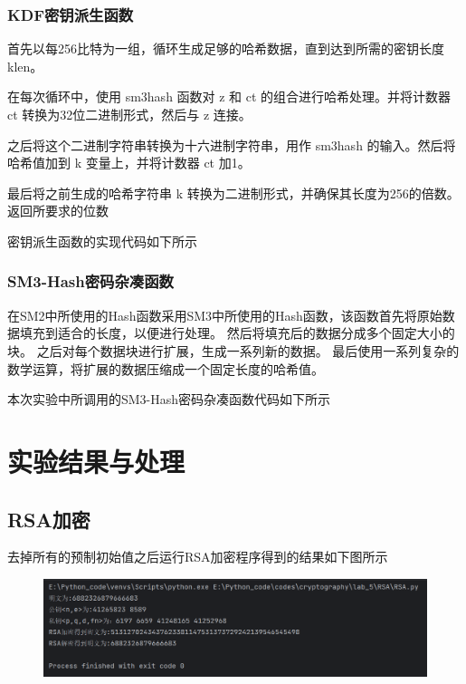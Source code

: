 \documentclass[a4paper,11pt,UTF8]{ctexart}
\newcommand{\bottomcaption}{%
\setlength{\abovecaptionskip}{6pt}%
\setlength{\belowcaptionskip}{6pt}%
\caption}
\newcommand{\xiaowuhao}{\fontsize{9pt}{\baselineskip}\selectfont}   %
\begin{document}
        \subsubsection{KDF密钥派生函数}
            首先以每256比特为一组，循环生成足够的哈希数据，直到达到所需的密钥长度 klen。\par
            在每次循环中，使用 sm3hash 函数对 z 和 ct 的组合进行哈希处理。并将计数器 ct 转换为32位二进制形式，然后与 z 连接。\par
            之后将这个二进制字符串转换为十六进制字符串，用作 sm3hash 的输入。然后将哈希值加到 k 变量上，并将计数器 ct 加1。\par
            最后将之前生成的哈希字符串 k 转换为二进制形式，并确保其长度为256的倍数。返回所要求的位数\par
            密钥派生函数的实现代码如下所示
            
            
        \subsubsection{SM3-Hash密码杂凑函数}
            在SM2中所使用的Hash函数采用SM3中所使用的Hash函数，该函数首先将原始数据填充到适合的长度，以便进行处理。
            然后将填充后的数据分成多个固定大小的块。
            之后对每个数据块进行扩展，生成一系列新的数据。
            最后使用一系列复杂的数学运算，将扩展的数据压缩成一个固定长度的哈希值。\par
            本次实验中所调用的SM3-Hash密码杂凑函数代码如下所示
            
\newpage   
\section{实验结果与处理}

    \subsection{RSA加密}
        去掉所有的预制初始值之后运行RSA加密程序得到的结果如下图所示
        \begin{figure}[H]
            \centering
            \includegraphics[width=13cm]{RSA_result.png}
            \bottomcaption{\xiaowuhao{RSA加解密结果}}
        \end{figure}
\end{document}
